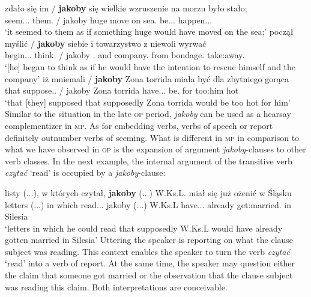 \documentclass[output=paper]{langsci/langscibook}
\begin{document}
\ea \ea \gll	zdało się im / \textbf{jakoby} się wielkie wzruszenie na morzu było stało; \label{korba_seem} \\
		seem.{\lptcp}.{\sg}.{\n} {} them.{\dat} / jakoby {} huge move on sea.{\LOC} be.{\lptcp}.{\sg}.{\n} happen.{\lptcp}.{\sg}.{\n} \\
	\glt	`it seemed to them as if something huge would have moved on the sea;' 
	\ex\gll	począł myślić / \textbf{jakoby} siebie i towarzystwo z niewoli wyrwać \label{korba_think} \\
		begin.{\lptcp}.{\sg}.{\masc} think.{\infv} / jakoby {}.{\acc} and company.{\acc} from bondage.{\gen} take:away.{\infv} \\
	\glt	`[he] began to think as if he would have the intention to rescue himself and the company' 
	\ex\gll	iż mniemali / \textbf{jakoby} Zona torrida miała być dla zbytniego gorąca \label{korba_suppose} \\
		that suppose.{\lptcp}.{\vir} / jakoby Zona torrida have.{\lptcp}.{\sg}.{\fem} be.{\infv} for {too:him} hot \\
	\glt	`that [they] supposed that supposedly Zona torrida would be too hot for him'
\z\z
Similar to the situation in the late \textsc{op} period, \emph{jakoby} can be used as a hearsay complementizer in \textsc{mp}. As for embedding verbs, verbs of speech or report definitely outnumber verbs of seeming. What is different in \textsc{mp} in comparison to what we have observed in \textsc{op} is the expansion of argument \emph{jakoby}-clauses to other verb classes. In the next example, the internal argument of the transitive verb \emph{czytać} `read' is occupied by a \emph{jakoby}-clause:

\ea \gll listy {\normalfont(...)}, w których czytał, \textbf{jakoby} {\normalfont(...)} W.Ks.L. miał się już ożenić w Śląsku \label{nic} \\
		letters (...) in which read.{\lptcp}.{\sg}.{\masc} jakoby (...) W.Ks.L have.{\lptcp}.{\sg}.{\masc} {} already {get:married}.{\infv} in Silesia \\
\glt	 `letters in which he could read that supposedly W.Ks.L would have already gotten married in Silesia' 
\z
Uttering  the speaker is reporting on what the clause subject was reading. This context enables the speaker to turn the verb \emph{czytać} `read' into a verb of report. At the same time, the speaker may question either the claim that someone got married or the observation that the clause subject was reading this claim. Both interpretations are conceivable.
\end{document}
